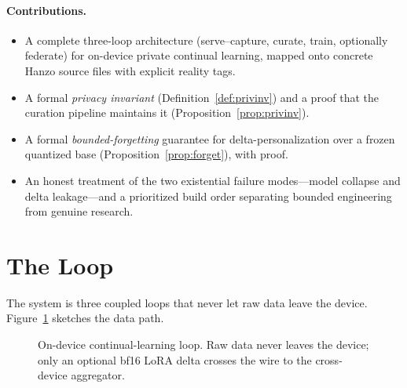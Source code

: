 \documentclass[11pt]{article}
\begin{document}
\paragraph{Contributions.}
\begin{itemize}
    \item A complete three-loop architecture (serve--capture, curate, train, optionally federate) for on-device private continual learning, mapped onto concrete Hanzo source files with explicit reality tags.
    \item A formal \emph{privacy invariant} (Definition~\ref{def:privinv}) and a proof that the curation pipeline maintains it (Proposition~\ref{prop:privinv}).
    \item A formal \emph{bounded-forgetting} guarantee for delta-personalization over a frozen quantized base (Proposition~\ref{prop:forget}), with proof.
    \item An honest treatment of the two existential failure modes---model collapse and delta leakage---and a prioritized build order separating bounded engineering from genuine research.
\end{itemize}

\section{The Loop}
\label{sec:loop}

The system is three coupled loops that never let raw data leave the device. Figure~\ref{fig:loop} sketches the data path.

\begin{figure}[t]
\centering
{}
\caption{On-device continual-learning loop. Raw data never leaves the device; only an optional bf16 LoRA delta crosses the wire to the cross-device aggregator.}
\label{fig:loop}
\end{figure}
\end{document}
